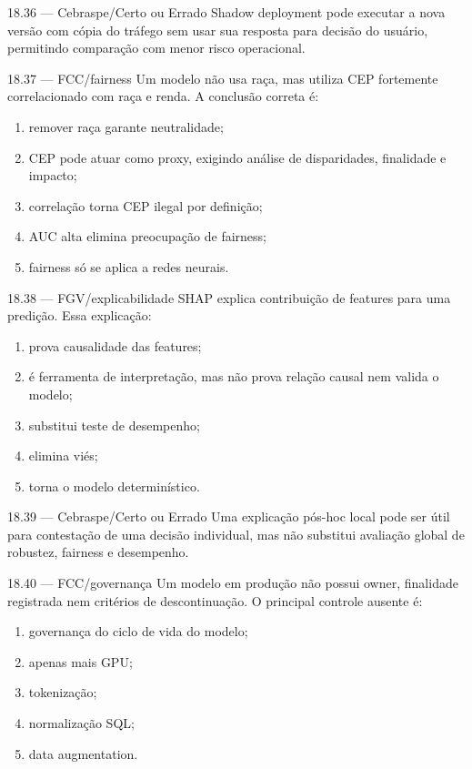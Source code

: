\begin{questao}{ 18.36 — Cebraspe/Certo ou Errado}
Shadow deployment pode executar a nova versão com cópia do tráfego sem usar sua resposta para decisão do usuário, permitindo comparação com menor risco operacional.
\end{questao}

\begin{questao}{ 18.37 — FCC/fairness}
Um modelo não usa raça, mas utiliza CEP fortemente correlacionado com raça e renda. A conclusão correta é:
\begin{enumerate}[label=\Alph*)]
\item remover raça garante neutralidade;
\item CEP pode atuar como proxy, exigindo análise de disparidades, finalidade e impacto;
\item correlação torna CEP ilegal por definição;
\item AUC alta elimina preocupação de fairness;
\item fairness só se aplica a redes neurais.
\end{enumerate}
\end{questao}

\begin{questao}{ 18.38 — FGV/explicabilidade}
SHAP explica contribuição de features para uma predição. Essa explicação:
\begin{enumerate}[label=\Alph*)]
\item prova causalidade das features;
\item é ferramenta de interpretação, mas não prova relação causal nem valida o modelo;
\item substitui teste de desempenho;
\item elimina viés;
\item torna o modelo determinístico.
\end{enumerate}
\end{questao}

\begin{questao}{ 18.39 — Cebraspe/Certo ou Errado}
Uma explicação pós-hoc local pode ser útil para contestação de uma decisão individual, mas não substitui avaliação global de robustez, fairness e desempenho.
\end{questao}

\begin{questao}{ 18.40 — FCC/governança}
Um modelo em produção não possui owner, finalidade registrada nem critérios de descontinuação. O principal controle ausente é:
\begin{enumerate}[label=\Alph*)]
\item governança do ciclo de vida do modelo;
\item apenas mais GPU;
\item tokenização;
\item normalização SQL;
\item data augmentation.
\end{enumerate}
\end{questao}


